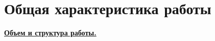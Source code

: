 
\section*{Общая характеристика работы}

\newcommand{\actuality}{\underline{\textbf{\actualityTXT}}}
\newcommand{\progress}{\underline{\textbf{\progressTXT}}}
\newcommand{\aim}{\underline{{\textbf\aimTXT}}}
\newcommand{\tasks}{\underline{\textbf{\tasksTXT}}}
\newcommand{\novelty}{\underline{\textbf{\noveltyTXT}}}
\newcommand{\influence}{\underline{\textbf{\influenceTXT}}}
\newcommand{\methods}{\underline{\textbf{\methodsTXT}}}
\newcommand{\defpositions}{\underline{\textbf{\defpositionsTXT}}}
\newcommand{\reliability}{\underline{\textbf{\reliabilityTXT}}}
\newcommand{\probation}{\underline{\textbf{\probationTXT}}}
\newcommand{\contribution}{\underline{\textbf{\contributionTXT}}}
\newcommand{\publications}{\underline{\textbf{\publicationsTXT}}}

\newcommand{\ccite}[1]{}
\newcommand{\cscite}[1]{}


\underline{\textbf{Объем и структура работы.}}

